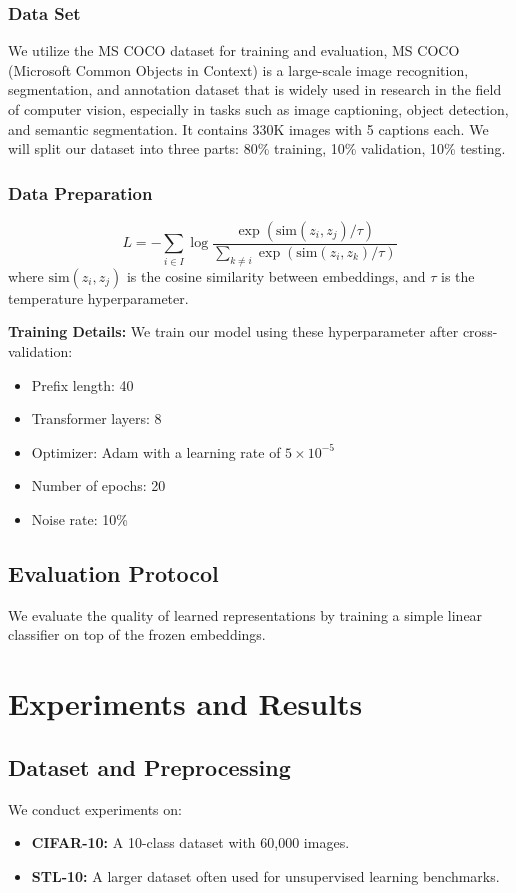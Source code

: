 \documentclass[11pt]{article}
\begin{document}
\subsubsection{Data Set}

We utilize the MS COCO dataset \cite{COCO}for training and evaluation, 
MS COCO (Microsoft Common Objects in Context) 
is a large-scale image recognition, segmentation, 
and annotation dataset that is widely used in research 
in the field of computer vision, especially in tasks 
such as image captioning, object detection, and semantic 
segmentation. It contains 330K images with 5 captions each. 
We will split our dataset into three parts: 80\% training, 10\% validation, 10\% testing.

\subsubsection{ Data Preparation}
\begin{equation}
    L = -\sum_{i \in I} \log \frac{\exp(\text{sim}(z_i, z_j)/\tau)}{\sum_{k \neq i}\exp(\text{sim}(z_i, z_k)/\tau)}
    \end{equation}
    where $\text{sim}(z_i, z_j)$ is the cosine similarity between embeddings, and $\tau$ is the temperature hyperparameter.
    
\textbf{Training Details:} We train our model using these hyperparameter after cross-validation:
\begin{itemize}
  \item Prefix length: 40
  \item Transformer layers: 8
  \item Optimizer: Adam with a learning rate of $5 \times 10^{-5}$
  \item Number of epochs: 20
  \item Noise rate: 10\%
\end{itemize}

\subsection{Evaluation Protocol}
We evaluate the quality of learned representations by training a simple linear classifier on top of the
frozen embeddings.

\section{Experiments and Results}

\subsection{Dataset and Preprocessing}
We conduct experiments on:
\begin{itemize}
  \item \textbf{CIFAR-10:} A 10-class dataset with 60,000 images.
  \item \textbf{STL-10:} A larger dataset often used for unsupervised learning benchmarks.
\end{itemize}
\end{document}
